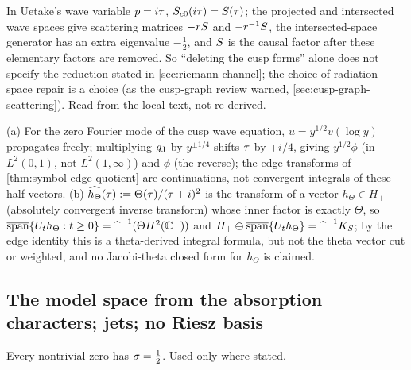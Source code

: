 \begin{observation}
\label{obs:symbol-is-reduced-causal-factor}
In Uetake's wave variable $p = i\tau$, $S_{c0}(i\tau) = S(\tau)$; the projected and intersected wave spaces give
scattering matrices $-rS$ and $-r^{-1}S$, the intersected-space generator has an extra eigenvalue
$-\tfrac12$, and $S$ is the causal factor after these elementary factors are removed. So ``deleting the cusp
forms'' alone does not specify the reduction stated in \cref{sec:riemann-channel}; the choice of radiation-space
repair is a choice (as the cusp-graph review warned, \cref{sec:cusp-graph-scattering}). Read from the local text,
not re-derived.
\end{observation}

\begin{proposition}
\label{prop:outgoing-generator}
(a) For the zero Fourier mode of the cusp wave equation, $u = y^{1/2}v(\log y)$ propagates freely; multiplying $g_{\mathrm J}$
by $y^{\pm1/4}$ shifts $\tau$ by $\mp i/4$, giving $y^{1/2}\phi$ (in $L^2(0,1)$, not $L^2(1,\infty)$) and $\phi$
(the reverse); the edge transforms of \cref{thm:symbol-edge-quotient} are continuations, not convergent integrals of
these half-vectors. (b) $\widehat{h_\Theta}(\tau) := \Theta(\tau)/(\tau+i)^2$ is the transform of a vector
$h_\Theta\in H_+$ (absolutely convergent inverse transform) whose inner factor is exactly $\Theta$, so
$\overline{\mathrm{span}}\{U_t h_\Theta:t\ge0\} = \widehat{\phantom{x}}^{-1}(\Theta H^2(\mathbb C_+))$ and
$H_+\ominus\overline{\mathrm{span}}\{U_t h_\Theta\} = \widehat{\phantom{x}}^{-1}K_S$; by the edge identity this is a
theta-derived integral formula, but not the theta vector cut or weighted, and no Jacobi-theta closed form for
$h_\Theta$ is claimed.
\end{proposition}

\subsection{The model space from the absorption characters; jets; no Riesz basis}

\begin{assumption}[RH]
\label{asm:rh}
Every nontrivial zero has $\sigma = \tfrac12$. Used only where stated.
\end{assumption}

